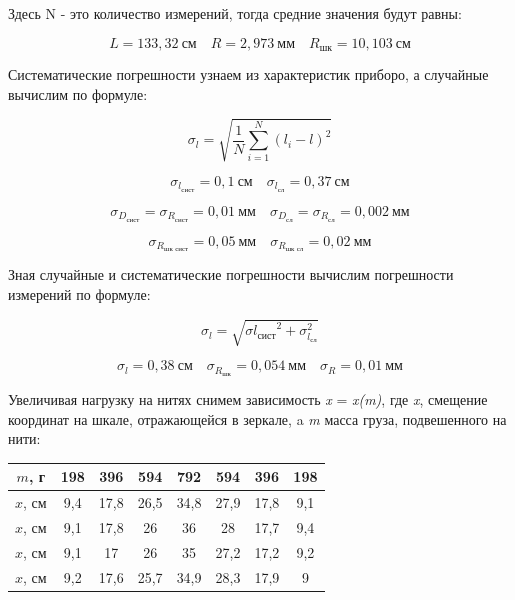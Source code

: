 \documentclass[12pt,a4paper]{article}
\begin{document}
Здесь N - это количество измерений, тогда средние значения будут равны:

\[L = 133,32 \: \textit{см} \quad R = 2,973 \: \textit{мм} \quad R_{\text{шк}} = 10,103 \: \textit{см}\]

Систематические погрешности узнаем из характеристик приборо, а случайные вычислим по формуле:

\begin{equation}\label{14}
\sigma_l = \sqrt{\frac{1}{N} \sum\limits_{\textit{i} = 1}^N (l_{\textit{i}} - l)^2}
\end{equation}

\[\sigma_{l_{\text{сист}}} = 0,1 \: \textit{см} \quad \sigma_{l_{\text{сл}}} = 0,37\: \textit{см}\]

\[\sigma_{D_{\text{сист}}} = \sigma_{R_{\text{сист}}} =  0,01\: \textit{мм} \quad \sigma_{D_{\text{сл}}} = \sigma_{R_{\text{сл}}} = 0,002 \: \textit{мм} \]

\[\sigma_{R_{\text{шк сист}}} =  0,05\: \textit{мм} \quad \sigma_{R_{\text{шк сл}}} = 0,02 \: \textit{мм} \]

Зная случайные и систематические погрешности вычислим погрешности измерений по формуле:

\begin{equation}\label{15}
\sigma_l = \sqrt{\sigma{l_{\text{сист}}}^2 + \sigma_{l_{\text{сл}}}^2}
\end{equation}

\[\sigma_l = 0,38 \: \textit{см} \quad \sigma_{R_{\text{шк}}} = 0,054\:\textit{мм} \quad \sigma_R = 0,01 \: \textit{мм}\]

Увеличивая нагрузку на нитях снимем зависимость \textit{x} = \textit{x(m)}, где \textit{x}, смещение координат на шкале, отражающейся в зеркале, a \textit{m} масса груза, подвешенного на нити:

\vspace{0,5cm}

\begin{tabular}{|c|c|c|c|c|c|c|c|}
\hline
$m$, г & 198 & 396 & 594 & 792 & 594 & 396 & 198 \\
\hline
$x$, см & 9,4 & 17,8 & 26,5 & 34,8 & 27,9 & 17,8 & 9,1 \\
\hline
$x$, см & 9,1 & 17,8 & 26 & 36 & 28 & 17,7 & 9,4 \\
\hline
$x$, см & 9,1 & 17 & 26 & 35 & 27,2 & 17,2 & 9,2 \\
\hline
$x$, см & 9,2 & 17,6 & 25,7 & 34,9 & 28,3 & 17,9 & 9 \\
\hline
\end{tabular}  
\end{document}
